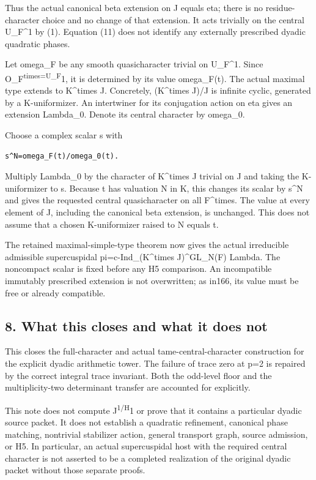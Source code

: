 Thus the actual canonical beta extension on J equals eta; there is no
residue-character choice and no change of that extension. It acts
trivially on the central U\_F\^{}1 by (1). Equation (11) does not
identify any externally prescribed dyadic quadratic phases.

Let omega\_F be any smooth quasicharacter trivial on U\_F\^{}1. Since
O\_F\textsuperscript{times=U\_F}1, it is determined by its value
omega\_F(t). The actual maximal type extends to K\^{}times J.
Concretely, (K\^{}times J)/J is infinite cyclic, generated by a
K-uniformizer. An intertwiner for its conjugation action on eta gives an
extension Lambda\_0. Denote its central character by omega\_0.

Choose a complex scalar s with

\begin{Verbatim}[fontsize=\small,breaklines=true,breakanywhere=true]
s^N=omega_F(t)/omega_0(t).
\end{Verbatim}

Multiply Lambda\_0 by the character of K\^{}times J trivial on J and
taking the K-uniformizer to s. Because t has valuation N in K, this
changes its scalar by s\^{}N and gives the requested central
quasicharacter on all F\^{}times. The value at every element of J,
including the canonical beta extension, is unchanged. This does not
assume that a chosen K-uniformizer raised to N equals t.

The retained maximal-simple-type theorem now gives the actual
irreducible admissible supercuspidal pi=c-Ind\_(K\^{}times
J)\^{}GL\_N(F) Lambda. The noncompact scalar is fixed before any H5
comparison. An incompatible immutably prescribed extension is not
overwritten; as in166, its value must be free or already compatible.

\hypertarget{dyadic_character-what-this-closes-and-what-it-does-not}{%
\subsection{8. What this closes and what it does
not}\label{dyadic_character-what-this-closes-and-what-it-does-not}}

This closes the full-character and actual tame-central-character
construction for the explicit dyadic arithmetic tower. The failure of
trace zero at p=2 is repaired by the correct integral trace invariant.
Both the odd-level floor and the multiplicity-two determinant transfer
are accounted for explicitly.

This note does not compute J\textsuperscript{1/H}1 or prove that it
contains a particular dyadic source packet. It does not establish a
quadratic refinement, canonical phase matching, nontrivial stabilizer
action, general transport graph, source admission, or H5. In particular,
an actual supercuspidal host with the required central character is not
asserted to be a completed realization of the original dyadic packet
without those separate proofs.

